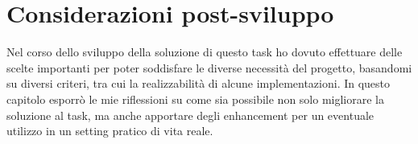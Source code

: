 \documentclass[italian, twoside]{sapthesis} %
\begin{document}


\chapter{Considerazioni post-sviluppo}
\label{chap:5}
\lettrine[lines=2, findent=3pt, nindent=0pt]{N}{}el corso dello sviluppo della soluzione di questo task ho dovuto effettuare delle scelte importanti per poter soddisfare le diverse necessità del progetto, basandomi su diversi criteri, tra cui la realizzabilità di alcune implementazioni. In questo capitolo esporrò le mie riflessioni su come sia possibile non solo migliorare la soluzione al task, ma anche apportare degli enhancement per un eventuale utilizzo in un setting pratico di vita reale.
\end{document}
